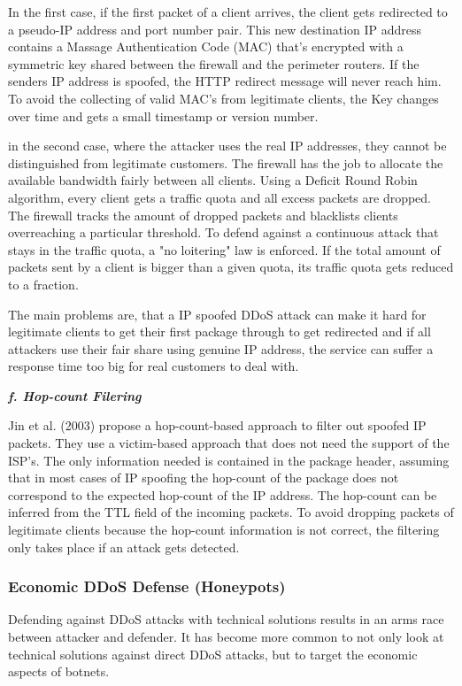 In the first case, if the first packet of a client arrives, the client gets redirected to a pseudo-IP address and port number pair.
This new destination IP address contains a Massage Authentication Code (MAC) that's encrypted with a symmetric key shared between the firewall and the perimeter routers.
If the senders IP address is spoofed, the HTTP redirect message will never reach him.
To avoid the collecting of valid MAC's from legitimate clients, the Key changes over time and gets a small timestamp or version number.\cite{Xu03}

in the second case, where the attacker uses the real IP addresses, they cannot be distinguished from legitimate customers.
The firewall has the job to allocate the available bandwidth fairly between all clients.
Using a Deficit Round Robin algorithm, every client gets a traffic quota and all excess packets are dropped.
The firewall tracks the amount of dropped packets and blacklists clients overreaching a particular threshold.
To defend against a continuous attack that stays in the traffic quota, a "no loitering" law is enforced.
If the total amount of packets sent by a client is bigger than a given quota, its traffic quota gets reduced to a fraction.\cite{Xu03}

The main problems are, that a IP spoofed DDoS attack can make it hard for legitimate clients to get their first package through to get redirected and if all attackers use their fair share using genuine IP address, the service can suffer a response time too big for real customers to deal with.\cite{Xu03}

\textbf{\textit{f. Hop-count Filering}}

Jin et al. (2003) propose a hop-count-based approach to filter out spoofed IP packets.
They use a victim-based approach that does not need the support of the ISP's.
The only information needed is contained in the package header, assuming that in most cases of IP spoofing the hop-count of the package does not correspond to the expected hop-count of the IP address.
The hop-count can be inferred from the TTL field of the incoming packets.
To avoid dropping packets of legitimate clients because the hop-count information is not correct, the filtering only takes place if an attack gets detected.\cite{Jin03}

\subsubsection{Economic DDoS Defense (Honeypots)}
Defending against DDoS attacks with technical solutions results in an arms race between attacker and defender.
It has become more common to not only look at technical solutions against direct DDoS attacks, but to target the economic aspects of botnets.

